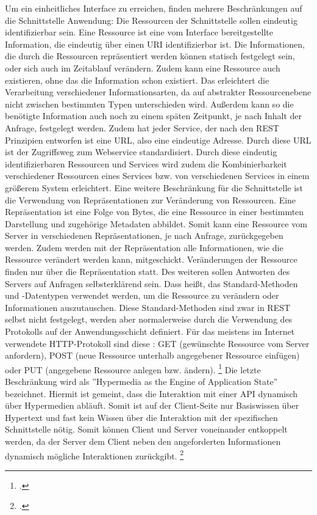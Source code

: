Um ein einheitliches Interface zu erreichen, finden mehrere Beschränkungen auf die Schnittstelle Anwendung: Die Ressourcen der Schnittstelle sollen eindeutig identifizierbar sein. Eine Ressource ist eine vom Interface bereitgestellte Information, die eindeutig über einen URI identifizierbar ist. Die Informationen, die durch die Ressourcen repräsentiert werden können statisch festgelegt sein, oder sich auch im Zeitablauf verändern. Zudem kann eine Ressource auch existieren, ohne das die Information schon existiert. Das erleichtert die Verarbeitung verschiedener Informationsarten, da auf abstrakter Ressourcenebene nicht zwischen bestimmten Typen unterschieden wird. Au{\ss}erdem kann so die benötigte Information auch noch zu einem späten Zeitpunkt, je nach Inhalt der Anfrage, festgelegt werden. Zudem hat jeder Service, der nach den REST Prinzipien entworfen ist eine URL, also eine eindeutige Adresse. Durch diese URL ist der Zugriffsweg zum Webservice standardisiert. Durch diese eindeutig identifizierbaren Ressourcen und Services wird zudem die Kombinierbarkeit verschiedener Ressourcen eines Services bzw. von verschiedenen Services in einem grö{\ss}erem System erleichtert. Eine weitere Beschränkung für die Schnittstelle ist die Verwendung von Repräsentationen zur Veränderung von Ressourcen. Eine Repräsentation ist eine Folge von Bytes, die eine Ressource in einer bestimmten Darstellung und zugehörige Metadaten abbildet. Somit kann eine Ressource vom Server in verschiedenen Repräsentationen, je nach Anfrage, zurückgegeben werden. Zudem werden mit der Repräsentation alle Informationen, wie die Ressource verändert werden kann, mitgeschickt. Veränderungen der Ressource finden nur über die Repräsentation statt. Des weiteren sollen Antworten des Servers auf Anfragen selbsterklärend sein. Dass hei{\ss}t, das Standard-Methoden und -Datentypen verwendet werden, um die Ressource zu verändern oder Informationen auszutauschen. Diese Standard-Methoden sind zwar in REST selbst nicht festgelegt, werden aber normalerweise durch die Verwendung des Protokolls auf der Anwendungsschicht definiert. Für das meistens im Internet verwendete HTTP-Protokoll sind diese \zB: GET (gewünschte Ressource vom Server anfordern), POST (neue Ressource unterhalb angegebener Ressource einfügen) oder PUT (angegebene Ressource anlegen bzw. ändern). \footcite[Vgl.][]{fielding_architectural_2000} Die letzte Beschränkung wird als ''Hypermedia as the Engine of Application State'' bezeichnet. Hiermit ist gemeint, dass die Interaktion mit einer API dynamisch über Hypermedien abläuft. Somit ist auf der Client-Seite nur Basiswissen über Hypertext und fast kein Wissen über die Interaktion mit der spezifischen Schnittstelle nötig. Somit können Client und Server voneinander entkoppelt werden, da der Server dem Client neben den angeforderten Informationen dynamisch mögliche Interaktionen zurückgibt. \footcite[Vgl.][]{fielding_rest_2008}

